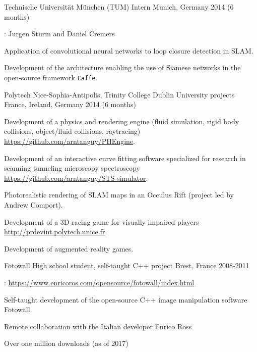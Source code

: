 \begin{cventries}
  \cventry
  {Technische Universität München (TUM)} %
  {Intern} %
  {Munich, Germany} %
  {2014 (6 months)} %
  {
    \begin{cvitems} %
    \item {}: Jurgen Sturm and Daniel Cremers
    \item Application of convolutional neural networks to loop closure detection in SLAM.
    \item Development of the architecture enabling the use of Siamese networks in the open-source framework {\tt Caffe}.
    \end{cvitems}
  }

  \cventry
  {Polytech Nice-Sophia-Antipolis, Trinity College Dublin} %
  {University projects} %
  {France, Ireland, Germany} %
  {2014 (6 months)} %
  {
    \begin{cvitems} %
    \item Development of a physics and rendering engine (fluid simulation, rigid body collisions,
      object/fluid collisions, raytracing)\\\url{https://github.com/arntanguy/PHEngine}.
    \item Development of an interactive curve fitting software specialized for research in scanning tunneling
      microscopy spectroscopy\\\url{https://github.com/arntanguy/STS-simulator}.
    \item Photorealistic rendering of SLAM maps in an Occulus Rift (project led by Andrew Comport).
    \item Development of a 3D racing game for visually impaired players\\\url{http://prdevint.polytech.unice.fr}.
    \item Development of augmented reality games.
    \end{cvitems}
  }

  \cventry
  {Fotowall} %
  {High school student, self-taught C++ project} %
  {Brest, France} %
  {2008-2011} %
  {
    \begin{cvitems} %
    \item {}: \url{https://www.enricoros.com/opensource/fotowall/index.html}
    \item Self-taught development of the open-source C++ image manipulation software Fotowall
    \item Remote collaboration with the Italian developer Enrico Ross
    \item Over one million downloads (as of 2017)
    \end{cvitems}
  }

\end{cventries}

